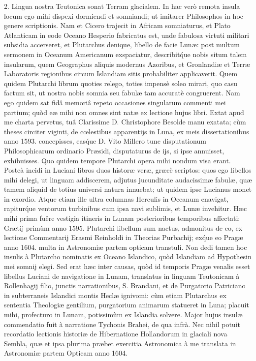 \documentclass[a4paper, 11pt, oneside, polutonikogreek, german]{article}
\begin{document}
2. Lingua nostra Teutonica sonat Terram glacialem. In hac verò remota insula locum ego mihi dispexi dormiendi et somniandi; ut imitarer Philosophos in hoc genere scriptionis. Nam et Cicero trajecit in Africam somniaturus, et Plato Atlanticam in eode Oceano Hesperio fabricatus est, unde fabulosa virtuti militari subsidia accerseret, et Plutarchus denique, libello de facie Lunæ: post multum sermonem in Oceanum Americanum exspaciatur, describit\'que nobis situm talem insularum, quem Geographus aliquis modernus Azoribus, et Gronlandiæ et Terræ Laboratoris regionibus circum Islandiam sitis probabiliter applicaverit. Quem quidem Plutarchi librum quoties relego, toties impensè soleo mirari, quo casu factum sit, ut nostra nobis somnia seu fabulæ tam accuratè congruerent. Nam ego quidem sat fidâ memoriâ repeto occasiones singularum commenti mei partium; quòd eæ mihi non omnes sint natæ ex lectione hujus libri. Extat apud me charta pervetus, tuâ Clarissime D. Christophore Besolde manu exatata; cùm theses circiter viginti, de cœlestibus apparentijs in Luna, ex meis dissertationibus anno 1593. concepisses, eas\'que D. Vito Millero tunc disputationum Philosophicarum ordinario Præsidi, disputaturus de ijs, si ipse annuisset, exhibuisses. Quo quidem tempore Plutarchi opera mihi nondum visa erant. Posteà incidi in Luciani libros duos historæ veræ, græcè scriptos: quos ego libellos mihi delegi, ut linguam addiscerem, adjutus jucunditate audacissimæ fabulæ, quæ tamem aliquid de totius universi natura innuebat; ut quidem ipse Lucianus monet in exordio. Atque etiam ille ultra columnas Herculis in Oceanum enavigat, rapitur\'que ventorum turbinibus cum ipsa navi sublimis, et Lunæ invehitur. Hæc mihi prima fuêre vestigia itineris in Lunam posterioribus temporibus affectati: Grætij primùm anno 1595. Plutarchi libellum sum nactus, admonitus de eo, ex lectione Commentarij Erasmi Reinholdi in Theorias Purbachij; ex\'que eo Pragæ anno 1604. multa in Astronomiæ partem opticam transtuli. Non dedi tamen hoc insulis à Plutarcho nominatis ex Oceano Islandico, quòd Islandiam ad Hypothesin mei somnij elegi. Sed erat hæc inter causas, quòd id temporis Pragæ venalis esset libellus Luciani de navigatione in Lunam, translatus in linguam Teutonicam à Rollenhagij filio, junctis narrationibus, S. Brandani, et de Purgatorio Patriciano in subterraneis Islandici montis Heclæ ignivomi: cùm etiam Plutarchus ex sententia Theologiæ gentilium, purgatorium animarum statueret in Luna; placuit mihi, profecturo in Lunam, potissimùm ex Islandia solvere. Major hujus insulæ commendatio fuit à narratione Tychonis Brahei, de qua infrà. Nec nihil potuit recordatio lectionis historiæ de Hibernatione Hollandorum in glaciali nova Sembla, quæ et ipsa plurima præbet exercitia Astronomica à me translata in Astronomiæ partem Opticam anno 1604.
\end{document}

